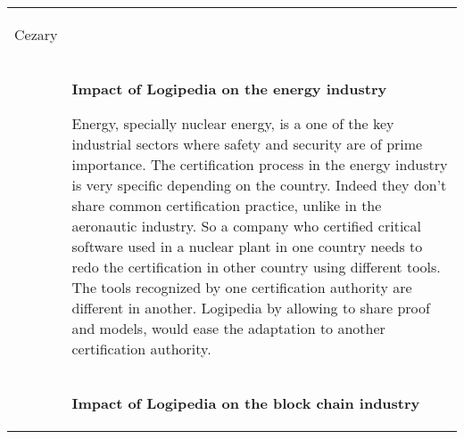 \begin{longtable}{|p{}|p{}|}
\begin{framed}
{\color{red} Cezary}  
\end{framed}\\
&
\begin{framed}
{\bf \Large Impact of Logipedia on the energy industry}

\medskip

Energy, specially nuclear energy, is a one of the key industrial sectors 
where safety and security are of prime importance.
The certification process in the energy industry is very specific
depending on the country. Indeed they don't share common certification
practice, unlike in the aeronautic industry. So a company who
certified critical software used in a nuclear plant in one country
needs to redo the certification in other country using different
tools. The tools recognized by one certification authority are
different in another.
Logipedia by allowing to share proof and models,
would ease the adaptation to another certification authority.
\end{framed}\\
&
\begin{framed}
{\bf \Large Impact of Logipedia on the block chain industry}


\end{framed}
\end{longtable}
